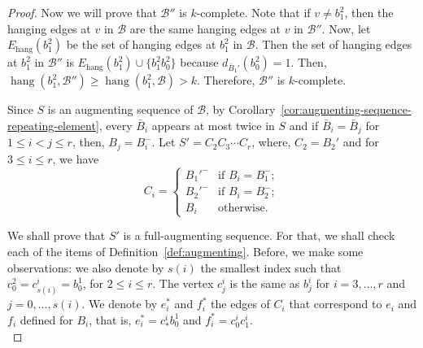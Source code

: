 \documentclass[12pt,reqno,a4paper]{amsart}
\DeclareMathOperator{\hang}{hang}
\newcommand{\B}{\mathcal{B}}
\newcommand{\full}{full}
\begin{document}
\begin{proof}
Now we will prove that \(\B''\) is 
\(k\)-complete. Note that if \(v\neq b_1^2\), then the hanging edges at \(v\)
in \(\B\) are the same hanging edges at \(v\) in \(\B''\).
Now, let \(E_{\hang}(b_1^2)\) be the set of hanging edges at \(b_1^2\) in 
\(\B\).
Then the set of hanging edges at \(b_1^2\) in \(\B''\) is 
\(E_{\hang}(b_1^2)\cup \{b_1^2b_0^2\}\) because 
\(d_{\bar B_1'}(b_0^2) = 1\).
Then, \(\hang(b_1^2,\B'') \geq \hang(b_1^2,\B) > k\).
Therefore, \(\B''\) is \(k\)-complete.





Since $S$ is an augmenting sequence of $\B$, by 
Corollary~\ref{cor:augmenting-sequence-repeating-element}, every $\bar B_i$ 
appears at most twice in $S$ and if 
$\bar B_i=\bar B_j$ for $1\leq i<j\leq r$, 
then, \(B_j = B_i^-\). 
Let \(S' = C_2C_3\cdots C_r\), where, $C_2= B_2'$ and for $3\leq i\leq r$, we have
\[C_i = \begin{cases} 
B_1'^- &\mbox{if } B_i= B_1^-; \\ 
B_2'^- &\mbox{if } B_i= B_2^-; \\ 
B_i & \mbox{otherwise}.\end{cases}\]



We shall prove that $S'$ is a \full-augmenting sequence. For that, we
shall check each of the items of
Definition~\ref{def:augmenting}. Before, we make some observations: we
also denote by $s(i)$ the smallest index such that
$c_0^2 = c_{s(i)}^i=b_0^1$, for $2 \leq i \leq r$.  The vertex $c_j^i$
is the same as $b_j^i$ for $i=3,\ldots,r$ and
$j=0,\ldots,s(i)$.  We denote by $e_i^*$ and $f_i^*$ the edges
  of $C_i$ that correspond to $e_i$ and $f_i$ defined for $B_i$, that
  is, $e_i^*= c_*^ib_0^1$ and $f_i^*=c_0^ic_1^i$.\\


\end{proof}
\end{document}
